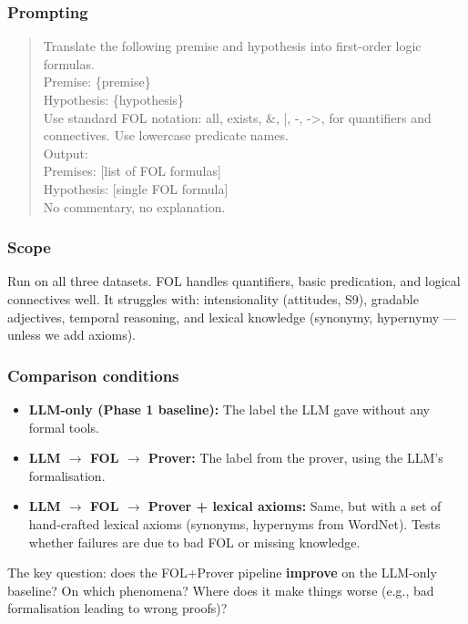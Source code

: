 \documentclass[11pt,a4paper]{article}
\begin{document}
\subsubsection{Prompting}

\begin{quote}\small\ttfamily
Translate the following premise and hypothesis into first-order logic formulas.\\[2pt]
Premise: \{premise\}\\
Hypothesis: \{hypothesis\}\\[2pt]
Use standard FOL notation: all, exists, \&, |, -, ->, for quantifiers and connectives. Use lowercase predicate names.\\[2pt]
Output:\\
Premises: [list of FOL formulas]\\
Hypothesis: [single FOL formula]\\
No commentary, no explanation.
\end{quote}

\subsubsection{Scope}

Run on all three datasets. FOL handles quantifiers, basic predication, and logical connectives well. It struggles with: intensionality (attitudes, S9), gradable adjectives, temporal reasoning, and lexical knowledge (synonymy, hypernymy --- unless we add axioms).

\subsubsection{Comparison conditions}

\begin{itemize}[nosep,leftmargin=1.5em]
\item \textbf{LLM-only (Phase 1 baseline):} The label the LLM gave without any formal tools.
\item \textbf{LLM $\to$ FOL $\to$ Prover:} The label from the prover, using the LLM's formalisation.
\item \textbf{LLM $\to$ FOL $\to$ Prover + lexical axioms:} Same, but with a set of hand-crafted lexical axioms (synonyms, hypernyms from WordNet). Tests whether failures are due to bad FOL or missing knowledge.
\end{itemize}

The key question: does the FOL+Prover pipeline \textbf{improve} on the LLM-only baseline? On which phenomena? Where does it make things worse (e.g., bad formalisation leading to wrong proofs)?
\end{document}
